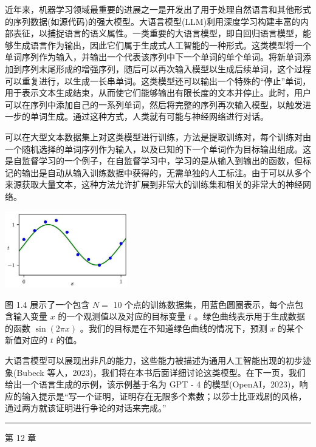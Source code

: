 \documentclass[10pt]{report}
\newcommand{\HRule}{\begin{center}\rule{0.9\linewidth}{0.2mm}\end{center}}
\begin{document}
近年来，机器学习领域最重要的进展之一是开发出了用于处理自然语言和其他形式的序列数据(如源代码)的强大模型。大语言模型(LLM)利用深度学习构建丰富的内部表征，以捕捉语言的语义属性。一类重要的大语言模型，即自回归语言模型，能够生成语言作为输出，因此它们属于生成式人工智能的一种形式。这类模型将一个单词序列作为输入，并输出一个代表该序列中下一个单词的单个单词。将新单词添加到序列末尾形成的增强序列，随后可以再次输入模型以生成后续单词，这个过程可以重复进行，以生成一长串单词。这类模型还可以输出一个特殊的“停止”单词，用于表示文本生成结束，从而使它们能够输出有限长度的文本并停止。此时，用户可以在序列中添加自己的一系列单词，然后将完整的序列再次输入模型，以触发进一步的单词生成。通过这种方式，人类就有可能与神经网络进行对话。

可以在大型文本数据集上对这类模型进行训练，方法是提取训练对，每个训练对由一个随机选择的单词序列作为输入，以及已知的下一个单词作为目标输出组成。这是自监督学习的一个例子，在自监督学习中，学习的是从输入到输出的函数，但标记的输出是自动从输入训练数据中获得的，无需单独的人工标注。由于可以从多个来源获取大量文本，这种方法允许扩展到非常大的训练集和相关的非常大的神经网络。

\begin{center}
\includegraphics[max width=0.4\textwidth]{images/0194e279-9b28-703a-88f4-c3ac21e2010d_25_946_344_607_378_0.jpg}
\end{center}
\hspace*{3em} 

图 1.4 展示了一个包含 \(N =\) 10 个点的训练数据集，用蓝色圆圈表示，每个点包含输入变量 \(x\) 的一个观测值以及对应的目标变量 \(t\) 。绿色曲线表示用于生成数据的函数 \(\sin \left( {2\pi x}\right)\) 。我们的目标是在不知道绿色曲线的情况下，预测 \(x\) 的某个新值对应的 \(t\) 的值。

大语言模型可以展现出非凡的能力，这些能力被描述为通用人工智能出现的初步迹象(Bubeck 等人，2023)，我们将在本书后面详细讨论这类模型。在下一页，我们给出一个语言生成的示例，该示例基于名为 GPT - 4 的模型(OpenAI，2023)，响应的输入提示是“写一个证明，证明存在无限多个素数；以莎士比亚戏剧的风格，通过两方就该证明进行争论的对话来完成。”

\HRule

第 12 章
\end{document}

